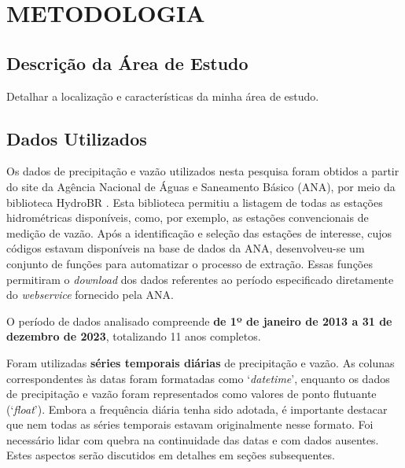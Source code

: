 \chapter{METODOLOGIA}
\section{Descrição da Área de Estudo}
Detalhar a localização e características da minha área de estudo.

\section{Dados Utilizados}

Os dados de precipitação e vazão utilizados nesta pesquisa foram obtidos a partir do site da Agência Nacional de Águas e Saneamento Básico (ANA), por meio da biblioteca HydroBR \cite{carvalho2020hydrobr}. Esta biblioteca permitiu a listagem de todas as estações hidrométricas disponíveis, como, por exemplo, as estações convencionais de medição de vazão. Após a identificação e seleção das estações de interesse, cujos códigos estavam disponíveis na base de dados da ANA, desenvolveu-se um conjunto de funções para automatizar o processo de extração. Essas funções permitiram o \textit{download} dos dados referentes ao período especificado diretamente do \textit{webservice} fornecido pela ANA.

O período de dados analisado compreende \textbf{de 1º de janeiro de 2013 a 31 de dezembro de 2023}, totalizando 11 anos completos.

Foram utilizadas \textbf{séries temporais diárias} de precipitação e vazão. As colunas correspondentes às datas foram formatadas como `\textit{datetime}', enquanto os dados de precipitação e vazão foram representados como valores de ponto flutuante (`\textit{float}'). Embora a frequência diária tenha sido adotada, é importante destacar que nem todas as séries temporais estavam originalmente nesse formato. Foi necessário lidar com quebra na continuidade das datas e com dados ausentes. Estes aspectos serão discutidos em detalhes em seções subsequentes.

